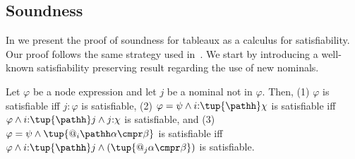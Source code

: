 \subsection{Soundness}\label{sec:soundness}

In  we present the proof of soundness for tableaux as a calculus for satisfiability.
Our proof follows the same strategy used in~\cite{Fit83,Fit96,Priest08}. 
We start by introducing a well-known satisfiability preserving result regarding the use of new nominals.




\begin{lem}
	\label{lemma:nom}
	\label{lemma:child}
        Let $\varphi$ be a node expression and let $j$ be a nominal not in $\varphi$.
		Then, (1) $\varphi$ is satisfiable iff $j{:}\varphi$ is satisfiable,
        (2) $\varphi = \psi \land i{:}\tup{\pathh}\chi$ is satisfiable iff $\varphi \land i{:}\tup{\pathh} j \land j{:}\chi$ is satisfiable, and 
        (3) $\varphi = \psi \land \tup{@_i \pathh\alpha \cmpr \beta}$ is satisfiable iff $\varphi \land i{:}\tup{\pathh} j \land (\tup{@_j \alpha \cmpr \beta})$ is satisfiable.
\end{lem}

